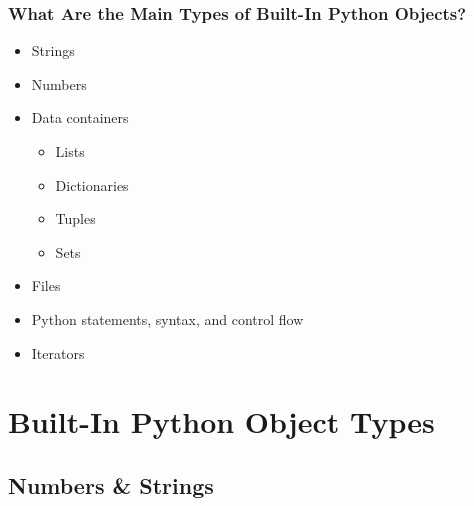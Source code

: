 \documentclass[aspectratio=1610]{beamer}
\begin{document}
\begin{frame}
    \frametitle{What Are the Main Types of Built-In Python Objects?}
    \begin{itemize}
        \item Strings
        \item Numbers
        \item Data containers
        \begin{itemize} 
            \item Lists 
            \item Dictionaries
            \item Tuples 
            \item Sets 
        \end{itemize}
        \item Files 
        \item Python statements, syntax, and control flow
        \item Iterators 
    \end{itemize}
\end{frame}

\section{Built-In Python Object Types }
\subsection{Numbers \& Strings}
\end{document}
